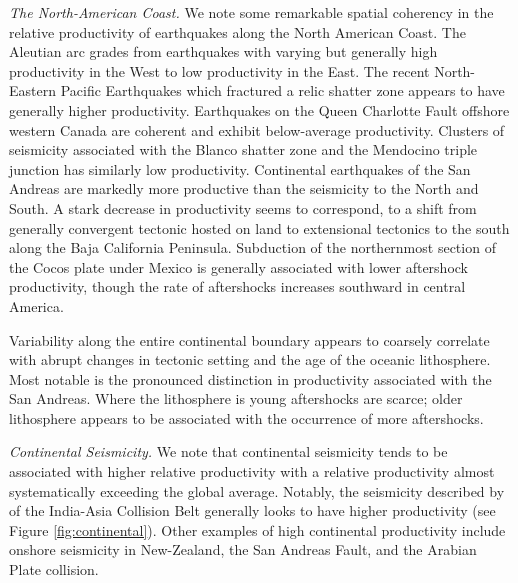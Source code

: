 \documentclass[12pt, notitlepage]{report}
\begin{document}
\textit{The North-American Coast.} We note some remarkable spatial coherency in the relative productivity of earthquakes along the North American Coast. The Aleutian arc grades from earthquakes with varying but generally high productivity in the West to low productivity in the East. The recent North-Eastern Pacific Earthquakes which fractured a relic shatter zone appears to have generally higher productivity. Earthquakes on the Queen Charlotte Fault offshore western Canada are coherent and exhibit below-average productivity. Clusters of seismicity associated with the Blanco shatter zone and the Mendocino triple junction has similarly low productivity. Continental earthquakes of the San Andreas are markedly more productive than the seismicity to the North and South. A stark decrease in productivity seems to correspond, to a shift from generally convergent tectonic hosted on land to extensional tectonics to the south along the Baja California Peninsula. Subduction of the northernmost section of the Cocos plate under Mexico is generally associated with lower aftershock productivity, though the rate of aftershocks increases southward in central America. 

Variability along the entire continental boundary appears to coarsely correlate with abrupt changes in tectonic setting and the age of the oceanic lithosphere. Most notable is the pronounced distinction in productivity associated with the San Andreas. Where the lithosphere is young aftershocks are scarce; older lithosphere appears to be associated with the occurrence of more aftershocks.




\textit{Continental Seismicity.} We note that continental seismicity tends to be associated with higher relative productivity with a relative productivity almost systematically exceeding the global average. Notably, the seismicity described by \textcite{Tahir2014Aftershock2005} of the India-Asia Collision Belt generally looks to have higher productivity (see Figure \ref{fig:continental}). Other examples of high continental productivity include onshore seismicity in New-Zealand, the San Andreas Fault, and the Arabian Plate collision.
\end{document}
